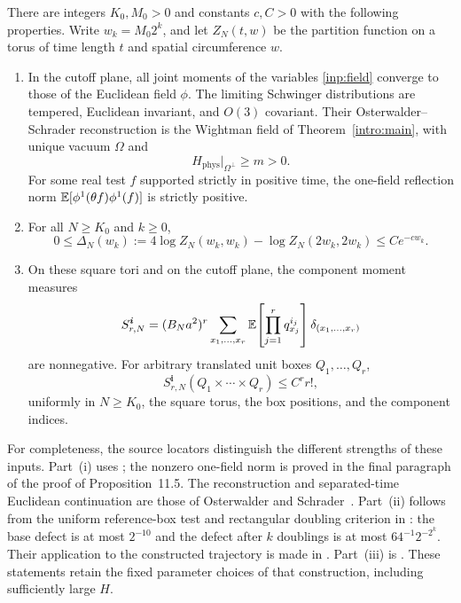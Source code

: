 \begin{proposition}
\label{inp:contracts}
There are integers $K_0,M_0>0$ and constants $c,C>0$ with the following
properties.  Write $w_k=M_0 2^k$, and let $Z_N(t,w)$ be the partition
function on a torus of time length $t$ and spatial circumference $w$.
\begin{enumerate}[label=\textup{(\roman*)}]
\item In the cutoff plane, all joint moments of the variables
\eqref{inp:field} converge to those of the Euclidean field $\phi$.
The limiting Schwinger distributions are tempered, Euclidean invariant,
and $O(3)$ covariant.  Their Osterwalder--Schrader reconstruction is the
Wightman field of Theorem~\ref{intro:main}, with unique vacuum $\Omega$
and
\[
 H_{\mathrm{phys}}|_{\Omega^\perp}\ge m>0.
\]
For some real test $f$ supported strictly in positive time, the
one-field reflection norm
$\mathbb E[\phi^1(\theta f)\phi^1(f)]$ is strictly positive.
\item For all $N\ge K_0$ and $k\ge0$,
\begin{equation}
 0\le \Delta_N(w_k)
 :=4\log Z_N(w_k,w_k)-\log Z_N(2w_k,2w_k)
 \le C e^{-c w_k}.
 \label{inp:defect}
\end{equation}
\item On these square tori and on the cutoff plane, the component
moment measures
\[
 S_{r,N}^{\boldsymbol i}
 =(B_Na^2)^r\sum_{x_1,\ldots,x_r}
     \mathbb E\!\left[\prod_{j=1}^r q_{x_j}^{i_j}\right]
     \delta_{(x_1,\ldots,x_r)}
\]
are nonnegative.  For arbitrary translated unit boxes $Q_1,\ldots,Q_r$,
\begin{equation}
 S_{r,N}^{\boldsymbol i}(Q_1\times\cdots\times Q_r)
 \le C^r r!,
 \label{inp:majorant}
\end{equation}
uniformly in $N\ge K_0$, the square torus, the box positions, and the
component indices.
\end{enumerate}
\end{proposition}

For completeness, the source locators distinguish the different
strengths of these inputs.  Part~(i) uses
\cite[Propositions~10.2, 10.3, 11.3, and 11.4]{OpenAI-O3}; the nonzero
one-field norm is proved in the final paragraph of the proof of
Proposition~11.5.  The reconstruction and separated-time
Euclidean continuation are those of
Osterwalder and Schrader~\cite{OsterwalderSchrader1973,OsterwalderSchrader1975}.
Part~(ii) follows from the uniform reference-box test and rectangular
doubling criterion in \cite[Propositions~8.1 and 8.3]{OpenAI-O3}:
the base defect is at most $2^{-10}$ and the defect after $k$ doublings
is at most $64^{-1}2^{-2^k}$.  Their application to the constructed
trajectory is made in \cite[Theorem~8.4]{OpenAI-O3}.  Part~(iii) is
\cite[Proposition~10.1]{OpenAI-O3}.  These statements retain the
fixed parameter choices of that construction, including sufficiently
large $H$.

